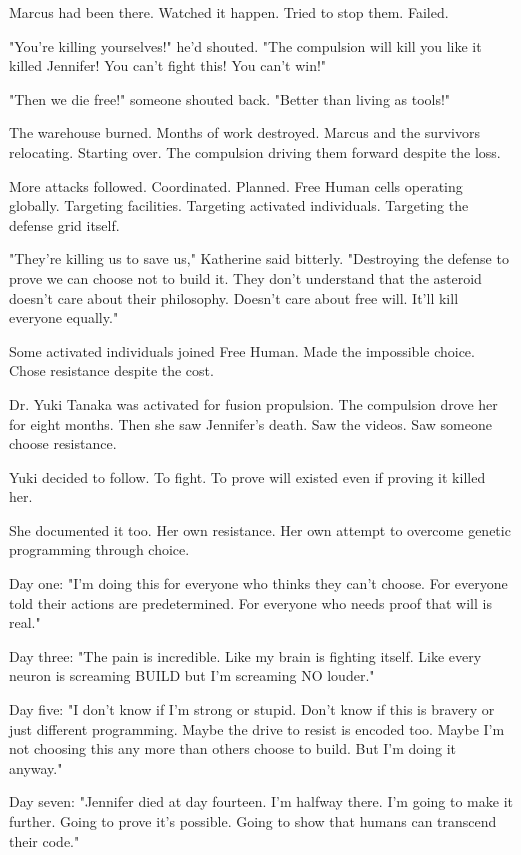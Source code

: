 Marcus had been there. Watched it happen. Tried to stop them. Failed.

"You're killing yourselves!" he'd shouted. "The compulsion will kill you like it killed Jennifer! You can't fight this! You can't win!"

"Then we die free!" someone shouted back. "Better than living as tools!"

The warehouse burned. Months of work destroyed. Marcus and the survivors relocating. Starting over. The compulsion driving them forward despite the loss.

More attacks followed. Coordinated. Planned. Free Human cells operating globally. Targeting facilities. Targeting activated individuals. Targeting the defense grid itself.

"They're killing us to save us," Katherine said bitterly. "Destroying the defense to prove we can choose not to build it. They don't understand that the asteroid doesn't care about their philosophy. Doesn't care about free will. It'll kill everyone equally."

\scenebreak

Some activated individuals joined Free Human. Made the impossible choice. Chose resistance despite the cost.

Dr. Yuki Tanaka was activated for fusion propulsion. The compulsion drove her for eight months. Then she saw Jennifer's death. Saw the videos. Saw someone choose resistance.

Yuki decided to follow. To fight. To prove will existed even if proving it killed her.

She documented it too. Her own resistance. Her own attempt to overcome genetic programming through choice.

Day one: "I'm doing this for everyone who thinks they can't choose. For everyone told their actions are predetermined. For everyone who needs proof that will is real."

Day three: "The pain is incredible. Like my brain is fighting itself. Like every neuron is screaming BUILD but I'm screaming NO louder."

Day five: "I don't know if I'm strong or stupid. Don't know if this is bravery or just different programming. Maybe the drive to resist is encoded too. Maybe I'm not choosing this any more than others choose to build. But I'm doing it anyway."

Day seven: "Jennifer died at day fourteen. I'm halfway there. I'm going to make it further. Going to prove it's possible. Going to show that humans can transcend their code."

